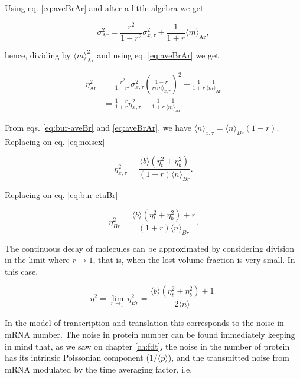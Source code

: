 Using eq. \ref{eq:aveBrAr} and after a little algebra we get

\begin{equation}
  \sigma^2_\text{Ar} = \frac{r^2}{1-r^2}\sigma^2_{x,\tau}+\frac{1}{1+r}\langle m\rangle_\text{Ar},
\end{equation}

hence, dividing by $\langle m\rangle_\text{Ar}^2$ and using eq. \eqref{eq:aveBrAr} we get

\begin{equation}
  \begin{split}
    \eta^2_\text{Ar} &= \frac{r^2}{1-r^2}\sigma^2_{x,\tau}\left(\frac{1-r}{r\langle m\rangle_{x,\tau}}\right)^2+\frac{1}{1+r}\frac{1}{\langle m\rangle_\text{Ar}}\\
    &=\frac{1-r}{1+r}\eta^2_{x,\tau}+\frac{1}{1+r}\frac{1}{\langle m\rangle_\text{Ar}}.
  \end{split}
\end{equation}

From eqs. \eqref{eq:bur-aveBr} and \eqref{eq:aveBrAr}, we have $\langle n\rangle_{x,\tau}=\langle n\rangle_{Br}(1-r)$. Replacing on eq. \eqref{eq:noisex}

\begin{equation*}
  \eta^2_{x,\tau} = \frac{\langle b\rangle(\eta^2_t+\eta^2_b)}{(1-r)\langle n\rangle_{Br}}.
\end{equation*}

Replacing on eq. \eqref{eq:bur-etaBr}

\begin{equation*}
  \eta^2_{Br} = \frac{\langle b\rangle(\eta^2_t+\eta^2_b) + r}{(1+r)\langle n\rangle_{Br}}.
\end{equation*}

The continuous decay of molecules can be approximated by considering division in the limit where $r\to 1$, that is, when the lost volume fraction is very small. In this case,

\begin{equation*}
  \eta^2 = \lim_{r\to_1}\eta^2_{Br} = \frac{\langle b\rangle(\eta^2_t+\eta^2_b) + 1}{2\langle n\rangle}.
\end{equation*}

In the model of transcription and translation this corresponds to the noise in mRNA number. The noise in protein number can be found immediately keeping in mind that, as we saw on chapter \ref{ch:fdt}, the noise in the number of protein has its intrinsic Poissonian component ($1/\langle p\rangle$), and the transmitted noise from mRNA modulated by the time averaging factor, i.e.

